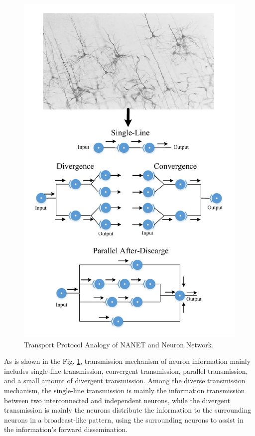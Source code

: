 \documentclass[journal,comsoc]{IEEEtran}
\begin{document}
			\begin{figure}[htbp]
				\centering
				\includegraphics[width=\linewidth]{figures/tran_protocol.pdf}
				\caption{Transport Protocol Analogy of NANET and Neuron Network.}	
				\label{fig: transport_pro}
			\end{figure}
			As is shown in the Fig. \ref{fig: transport_pro}, transmission mechanism of neuron information mainly includes single-line transmission, convergent transmission, parallel transmission, and a small amount of divergent transmission.
			Among the diverse transmission mechanism, the single-line transmission is mainly the information transmission between two interconnected and independent neurons, while the divergent transmission is mainly the neurons distribute the information to the surrounding neurons in a broadcast-like pattern, using the surrounding neurons to assist in the information's forward dissemination.
\end{document}
